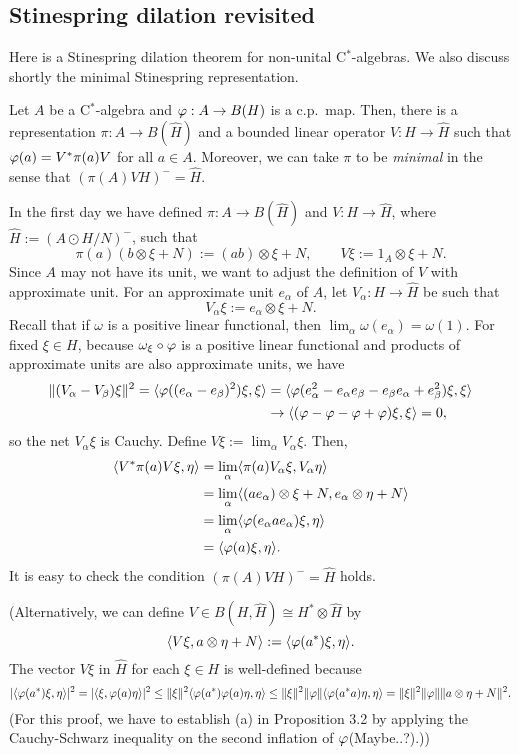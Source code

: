 \documentclass{../../../small}
\begin{document}
\subsection{Stinespring dilation revisited}

Here is a Stinespring dilation theorem for non-unital C$^*$-algebras.
We also discuss shortly the minimal Stinespring representation.

\begin{thm}
Let $A$ be a C$^*$-algebra and $\varphi:A\to B(H)$ is a c.p.~map.
Then, there is a representation $\pi:A\to B(\hat H)$ and a bounded linear operator $V:H\to\hat H$ such that $\varphi(a)=V^*\pi(a)V$ for all $a\in A$.
Moreover, we can take $\pi$ to be \emph{minimal} in the sense that $(\pi(A)VH)^-=\hat H$.
\end{thm}
\begin{pf}
In the first day we have defined $\pi:A\to B(\hat H)$ and $V:H\to\hat H$, where $\hat H:=(A\odot H/N)^-$, such that
\[\pi(a)(b\otimes\xi+N):=(ab)\otimes\xi+N,\qquad V\xi:=1_ A\otimes\xi+N.\]
Since $A$ may not have its unit, we want to adjust the definition of $V$ with approximate unit.
For an approximate unit $e_\alpha$ of $A$, let $V_\alpha:H\to\hat H$ be such that
\[V_\alpha\xi:=e_\alpha\otimes\xi+N.\]
Recall that if $\omega$ is a positive linear functional, then $\lim_\alpha\omega(e_\alpha)=\omega(1)$.
For fixed $\xi\in H$, because $\omega_\xi\circ\varphi$ is a positive linear functional and products of approximate units are also approximate units, we have
\begin{align*}
\|(V_\alpha-V_\beta)\xi\|^2=\langle\varphi((e_\alpha-e_\beta)^2)\xi,\xi\rangle&=\langle\varphi(e_\alpha^2-e_\alpha e_\beta-e_\beta e_\alpha+e_\beta^2)\xi,\xi\rangle\\
&\to\langle(\varphi-\varphi-\varphi+\varphi)\xi,\xi\rangle=0,
\end{align*}
so the net $V_\alpha\xi$ is Cauchy.
Define $V\xi:=\lim_\alpha V_\alpha\xi$.
Then,
\begin{align*}
\langle V^*\pi(a)V\xi,\eta\rangle
&=\lim_\alpha\langle\pi(a)V_\alpha\xi,V_\alpha\eta\rangle\\
&=\lim_\alpha\langle(ae_\alpha)\otimes\xi+N,e_\alpha\otimes\eta+N\rangle\\
&=\lim_\alpha\langle\varphi(e_\alpha ae_\alpha)\xi,\eta\rangle\\
&=\langle\varphi(a)\xi,\eta\rangle.
\end{align*}
It is easy to check the condition $(\pi(A)VH)^-=\hat H$ holds.

(Alternatively, we can define $V\in B(H,\hat H)\cong H^*\otimes\hat H$ by
\[\langle V\xi,a\otimes\eta+N\rangle:=\langle\varphi(a^*)\xi,\eta\rangle.\]
The vector $V\xi$ in $\hat H$ for each $\xi\in H$ is well-defined because
\[|\langle\varphi(a^*)\xi,\eta\rangle|^2=|\langle\xi,\varphi(a)\eta\rangle|^2\le\|\xi\|^2\langle\varphi(a^*)\varphi(a)\eta,\eta\rangle\le\|\xi\|^2\|\varphi\|\langle\varphi(a^*a)\eta,\eta\rangle=\|\xi\|^2\|\varphi\|\|a\otimes\eta+N\|^2.\]
(For this proof, we have to establish (a) in Proposition 3.2 by applying the Cauchy-Schwarz inequality on the second inflation of $\varphi$(Maybe..?).))
\end{pf}
\end{document}
